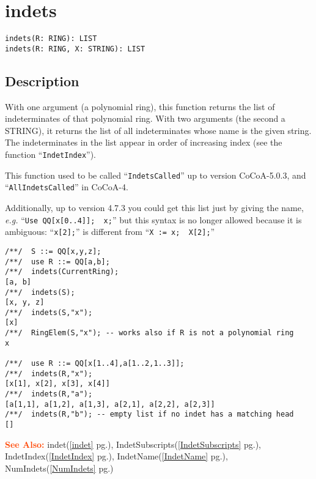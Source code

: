 \documentclass[a4paper]{mybook}
\newenvironment{command}{}{} %
\newcommand\SeeAlso{\par\textcolor{OrangeRed}{\textbf{\large See Also: }}}
\begin{document}
\section{indets}
\label{indets}
\begin{command} %


\begin{Verbatim}[label=syntax, rulecolor=\color{MidnightBlue},
frame=single]
indets(R: RING): LIST
indets(R: RING, X: STRING): LIST
\end{Verbatim}


\subsection*{Description}

With one argument (a polynomial ring), this function returns the
list of indeterminates of that polynomial ring.
With two arguments (the second a STRING), it returns the
list of all indeterminates whose name is the given string.
The indeterminates in the list appear in order of increasing
index (see the function ``\verb&IndetIndex&'').
\par 
This function used to be called ``\verb&IndetsCalled&'' up to version CoCoA-5.0.3,
and ``\verb&AllIndetsCalled&'' in CoCoA-4.
\par 
Additionally, up to version 4.7.3 you could get this list just by giving
the name, \textit{e.g.} ``\verb&Use QQ[x[0..4]];  x;&'' but this syntax is no longer
allowed because it is ambiguous:
``\verb&x[2];&'' is different from ``\verb&X := x;  X[2];&''
\begin{Verbatim}[label=example, rulecolor=\color{PineGreen}, frame=single]
/**/  S ::= QQ[x,y,z];
/**/  use R ::= QQ[a,b];
/**/  indets(CurrentRing);
[a, b]
/**/  indets(S);
[x, y, z]
/**/  indets(S,"x");
[x]
/**/  RingElem(S,"x"); -- works also if R is not a polynomial ring
x

/**/  use R ::= QQ[x[1..4],a[1..2,1..3]];
/**/  indets(R,"x");
[x[1], x[2], x[3], x[4]]
/**/  indets(R,"a");
[a[1,1], a[1,2], a[1,3], a[2,1], a[2,2], a[2,3]]
/**/  indets(R,"b"); -- empty list if no indet has a matching head
[]
\end{Verbatim}


\SeeAlso %
  indet(\ref{indet} pg.\pageref{indet}), 
    IndetSubscripts(\ref{IndetSubscripts} pg.\pageref{IndetSubscripts}), 
    IndetIndex(\ref{IndetIndex} pg.\pageref{IndetIndex}), 
    IndetName(\ref{IndetName} pg.\pageref{IndetName}), 
    NumIndets(\ref{NumIndets} pg.\pageref{NumIndets})
\end{command} %
\end{document}
